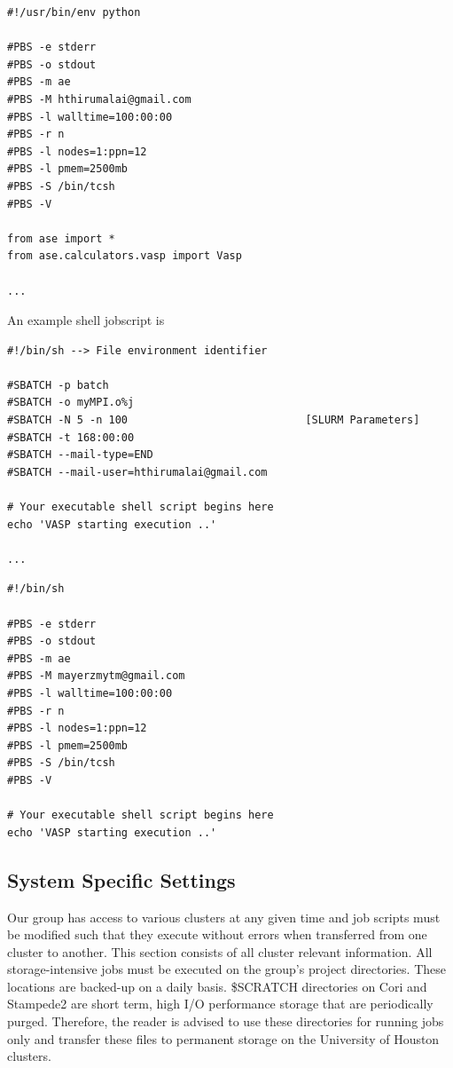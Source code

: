 \documentclass[11pt]{article}
\begin{document}
\begin{verbatim}
#!/usr/bin/env python

#PBS -e stderr
#PBS -o stdout
#PBS -m ae
#PBS -M hthirumalai@gmail.com
#PBS -l walltime=100:00:00
#PBS -r n
#PBS -l nodes=1:ppn=12
#PBS -l pmem=2500mb
#PBS -S /bin/tcsh
#PBS -V

from ase import *
from ase.calculators.vasp import Vasp

...
\end{verbatim}

An example shell jobscript is
\begin{verbatim}
#!/bin/sh --> File environment identifier

#SBATCH -p batch
#SBATCH -o myMPI.o%j
#SBATCH -N 5 -n 100                            [SLURM Parameters]
#SBATCH -t 168:00:00
#SBATCH --mail-type=END
#SBATCH --mail-user=hthirumalai@gmail.com

# Your executable shell script begins here
echo 'VASP starting execution ..'

...
\end{verbatim}

\begin{verbatim}
#!/bin/sh

#PBS -e stderr
#PBS -o stdout
#PBS -m ae
#PBS -M mayerzmytm@gmail.com
#PBS -l walltime=100:00:00
#PBS -r n
#PBS -l nodes=1:ppn=12
#PBS -l pmem=2500mb
#PBS -S /bin/tcsh
#PBS -V

# Your executable shell script begins here
echo 'VASP starting execution ..'
\end{verbatim}

\subsection{System Specific Settings}
\label{sec-2-3}
Our group has access to various clusters at any given time and job scripts must be modified such that they execute without errors when transferred from one cluster to another. This section consists of all cluster relevant information. All storage-intensive jobs must be executed on the group's project directories. These locations are backed-up on a daily basis. \$SCRATCH directories on Cori and Stampede2 are short term, high I/O performance storage that are periodically purged. Therefore, the reader is advised to use these directories for running jobs only and transfer these files to permanent storage on the University of Houston clusters.
\end{document}
